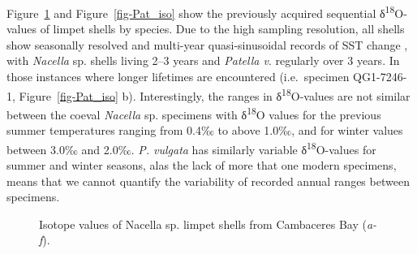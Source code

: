 \documentclass[
  authoryear,
  preprint,
  3p]{elsarticle}
\begin{document}
Figure~\ref{fig-Nac_iso} and Figure~\ref{fig-Pat_iso} show the
previously acquired sequential δ\textsuperscript{18}O-values of limpet
shells by species. Due to the high sampling resolution, all shells show
seasonally resolved and multi-year quasi-sinusoidal records of SST
change , with \emph{Nacella} sp. shells living 2--3 years and
\emph{Patella v}. regularly over 3 years. In those instances where
longer lifetimes are encountered (i.e.~specimen QG1-7246-1,
Figure~\ref{fig-Pat_iso} b). Interestingly, the ranges in
δ\textsuperscript{18}O-values are not similar between the coeval
\emph{Nacella} sp. specimens with δ\textsuperscript{18}O values for the
previous summer temperatures ranging from 0.4‰ to above 1.0‰, and for
winter values between 3.0‰ and 2.0‰. \emph{P. vulgata} has similarly
variable δ\textsuperscript{18}O-values for summer and winter seasons,
alas the lack of more that one modern specimens, means that we cannot
quantify the variability of recorded annual ranges between specimens.

\begin{figure}


\caption{\label{fig-Nac_iso}Isotope values of Nacella sp. limpet shells
from Cambaceres Bay (\emph{a-f}).}

\end{figure}%
\end{document}
